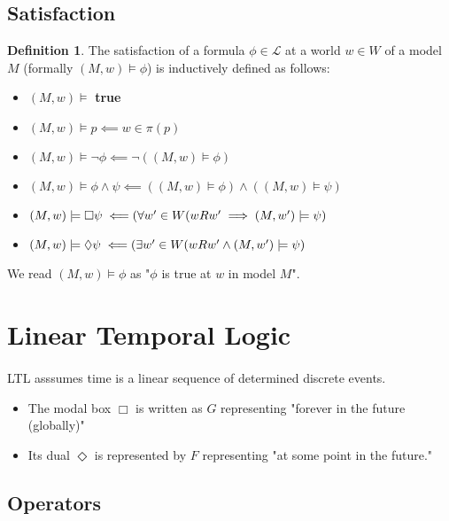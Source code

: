 \documentclass{article}
\theoremstyle{plain}
\theoremstyle{definition}
\newtheorem{defn}[thm]{Definition} %
\begin{document}
\begin{multicols}{2}
\subsection{Satisfaction}

\begin{defn}The satisfaction of a formula $\phi\in\mathcal{L}$ at a world $w\in W$ of a model $M$ (formally $(M, w) \models \phi$) is inductively defined as follows:\end{defn}

\begin{itemize}
\item $(M, w) \models $ \textbf{true}
\item $(M, w) \models p \impliedby w \in \pi(p)$
\item $(M, w) \models \lnot\phi \impliedby \lnot((M, w)\models \phi)$
\item $(M, w) \models \phi \land \psi \impliedby ((M,w) \models \phi) \land ((M, w) \models \psi)$
\item $(M, w) \models \Box\psi \impliedby\\ (\forall w' \in W (w R w' \implies (M, w') \models \psi)$
\item $(M, w) \models \Diamond\psi \impliedby\\ (\exists w' \in W (w R w' \land (M, w') \models \psi)$
\end{itemize}

\noindent We read $(M, w) \models \phi$ as "$\phi$ is true at $w$ in model $M$".

\section{Linear Temporal Logic}

\paragraph{} LTL asssumes time is a linear sequence of determined discrete events. 

\begin{itemize}
\item The modal box $\Box$ is written as $G$ representing "forever in the future (globally)"
\item Its dual $\Diamond$ is represented by $F$ representing "at some point in the future."
\end{itemize}

\subsection{Operators}


\end{multicols}
\end{document}
